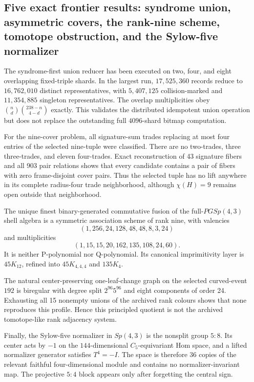 \subsection{Five exact frontier results: syndrome union, asymmetric covers, the rank-nine scheme, tomotope obstruction, and the Sylow-five normalizer}

The syndrome-first union reducer has been executed on two, four, and eight overlapping fixed-triple shards.  In the largest run, \(17{,}525{,}360\) records reduce to \(16{,}762{,}010\) distinct representatives, with \(5{,}407{,}125\) collision-marked and \(11{,}354{,}885\) singleton representatives.  The overlap multiplicities obey \(\binom nd\binom{238-n}{4-d}\) exactly.  This validates the distributed idempotent union operation but does not replace the outstanding full \(4096\)-shard bitmap computation.

For the nine-cover problem, all signature-sum trades replacing at most four entries of the selected nine-tuple were classified.  There are no two-trades, three three-trades, and eleven four-trades.  Exact reconstruction of 43 signature fibers and all 903 pair relations shows that every candidate contains a pair of fibers with zero frame-disjoint cover pairs.  Thus the selected tuple has no lift anywhere in its complete radius-four trade neighborhood, although \(\chi(H)=9\) remains open outside that neighborhood.

The unique finest binary-generated commutative fusion of the full-\(PGSp(4,3)\) shell algebra is a symmetric association scheme of rank nine, with valencies
\[
(1,256,24,128,48,48,8,3,24)
\]
and multiplicities
\[
(1,15,15,20,162,135,108,24,60).
\]
It is neither P-polynomial nor Q-polynomial.  Its canonical imprimitivity layer is \(45K_{12}\), refined into \(45K_{4,4,4}\) and \(135K_4\).

The natural center-preserving one-leaf-change graph on the selected curved-event \(192\) is biregular with degree split \(2^{96}5^{96}\) and eight components of order 24.  Exhausting all 15 nonempty unions of the archived rank colours shows that none reproduces this profile.  Hence this principled quotient is not the archived tomotope-like rank adjacency system.

Finally, the Sylow-five normalizer in \(Sp(4,3)\) is the nonsplit group \(5{:}8\).  Its center acts by \(-1\) on the \(144\)-dimensional \(C_5\)-equivariant Hom space, and a lifted normalizer generator satisfies \(T^4=-I\).  The space is therefore 36 copies of the relevant faithful four-dimensional module and contains no normalizer-invariant map.  The projective \(5{:}4\) block appears only after forgetting the central sign.
